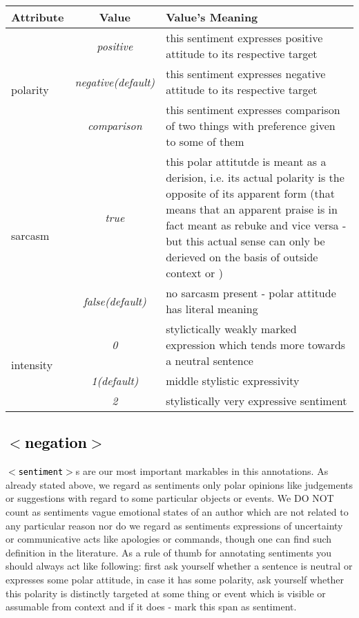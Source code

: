 \documentclass[11pt,a4paper]{article}
\newcommand{\xmltag}[1]{\textcolor{black}{{\small$<$#1$>$}}}
\begin{document}
\begin{tabular}{|l|c|p{}|}\hline
  Attribute & Value & Value's Meaning\\\hline

  \multirow{3}{*}{polarity} & \textit{positive} & this sentiment
  expresses positive attitude to its respective target\\\cline{2-3}

  & \textit{negative\newline(default)} & this sentiment
  expresses negative attitude to its respective target\\\cline{2-3}

  & \textit{comparison} & this sentiment expresses comparison of two
  things with preference given to some of them\\\hline


  \multirow{2}{*}{sarcasm} & \textit{true} & this polar attitutde is
  meant as a derision, i.e. its actual polarity is the opposite of its
  apparent form (that means that an apparent praise is in fact meant
  as rebuke and vice versa - but this actual sense can only be
  derieved on the basis of outside context or )\\\cline{2-3}

  & \textit{false\newline(default)} & no sarcasm present - polar
  attitude has literal meaning\\\hline

  \multirow{3}{*}{intensity} & \textit{0} & stylictically weakly
  marked expression which tends more towards a neutral
  sentence\\\cline{2-3}

  & \textit{1\newline(default)} & middle stylistic
  expressivity\\\cline{2-3}

  & \textit{2} & stylistically very expressive sentiment\\\hline
\end{tabular}

\subsection{\xmltag{negation}}
\texttt{\xmltag{sentiment}}s are our most important markables in this
annotations. As already stated above, we regard as sentiments only
polar opinions like judgements or suggestions with regard to some
particular objects or events. We DO NOT count as sentiments vague
emotional states of an author which are not related to any particular
reason nor do we regard as sentiments expressions of uncertainty or
communicative acts like apologies or commands, though one can find
such definition in the literature. As a rule of thumb for annotating
sentiments you should always act like following: first ask yourself
whether a sentence is neutral or expresses some polar attitude, in
case it has some polarity, ask yourself whether this polarity is
distinctly targeted at some thing or event which is visible or
assumable from context and if it does - mark this span as sentiment.
\end{document}

